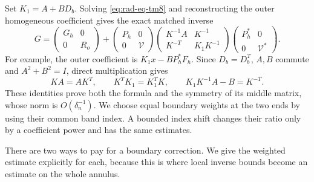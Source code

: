 Set $K_1=A+BD_b$.  Solving \eqref{eq:rad-eq-tm8} and reconstructing
the outer homogeneous coefficient gives the exact matched inverse
\begin{equation}\label{eq:rad-eq-tm11}
 G=\begin{pmatrix}G_h&0\\0&R_o\end{pmatrix}
  +\begin{pmatrix}P_h&0\\0&\mathcal V\end{pmatrix}
   \begin{pmatrix}
       K^{-1}A&K^{-1}\\K^{-T}&K_1K^{-1}
   \end{pmatrix}
   \begin{pmatrix}P_h^*&0\\0&\mathcal V^*\end{pmatrix}.
\end{equation}
For example, the outer coefficient is
$K_1x-BP_h^*F_h$.  Since $D_b=D_b^T$, $A,B$ commute and
$A^2+B^2=I$, direct multiplication gives
\[
 KA=AK^T,\qquad K^TK_1=K_1^TK,\qquad
 K_1K^{-1}A-B=K^{-T}.
\]
These identities prove both the formula and the symmetry of its middle
matrix, whose norm is $O(\delta_n^{-1})$.
We choose equal boundary weights at the two ends by using their common
band index.  A bounded index shift changes their ratio only by a
coefficient power and has the same estimates.

There are two ways to pay for a boundary correction.  We give the
weighted estimate explicitly for each, because this is where local
inverse bounds become an estimate on the whole annulus.

